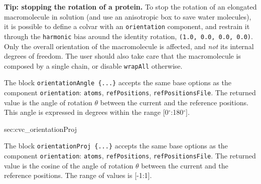 \textbf{Tip: stopping the rotation of a protein.}  To stop the
rotation of an elongated macromolecule in solution (and use an
anisotropic box to save water molecules), it is possible to define a
colvar with an \texttt{orientation} component, and restrain it through
the \texttt{harmonic} bias around the identity rotation, \texttt{(1.0,
  0.0, 0.0, 0.0)}.  Only the overall orientation of the macromolecule
is affected, and \emph{not} its internal degrees of freedom.  The user
should also take care that the macromolecule is composed by a single
chain, or disable \texttt{wrapAll} otherwise.




The block \texttt{orientationAngle~\{...\}} accepts the same base options as
the component \texttt{orientation}: \texttt{atoms}, \texttt{refPositions}, \texttt{refPositionsFile}.
The returned value is the angle of rotation $\theta$ between the current and the reference positions.
This angle is expressed in degrees within the range [0$^{\circ}$:180$^{\circ}$].

\begin{cvcoptions}
\item %
\item %
\item %

\end{cvcoptions}


  {sec:cvc_orientationProj}

The block \texttt{orientationProj~\{...\}} accepts the same base options as
the component \texttt{orientation}: \texttt{atoms}, \texttt{refPositions}, \texttt{refPositionsFile}.
The returned value is the cosine of the angle of rotation $\theta$ between the current and the reference positions.
The range of values is [-1:1].

